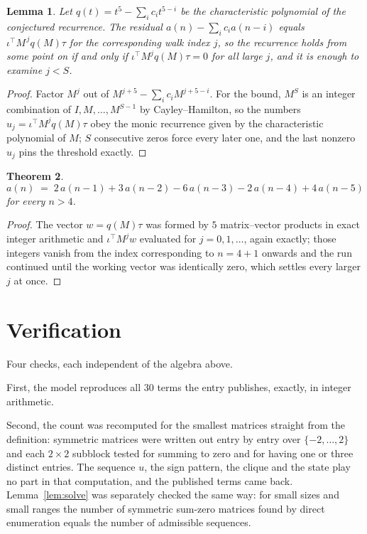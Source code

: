 \documentclass[11pt,a4paper]{article}
\theoremstyle{plain}
\newtheorem{theorem}{Theorem}
\newtheorem{lemma}[theorem]{Lemma}
\theoremstyle{definition}
\begin{document}
\begin{lemma}\label{lem:crit}
Let $q(t)=t^{5}-\sum_i c_it^{5-i}$ be the characteristic polynomial of the
conjectured recurrence. The residual $a(n)-\sum_ic_ia(n-i)$ equals
$\iota^{\!\top}M^{\,j}q(M)\tau$ for the corresponding walk index $j$, so the recurrence
holds from some point on if and only if $\iota^{\!\top}M^{j}q(M)\tau=0$ for all large $j$,
and it is enough to examine $j<S$.
\end{lemma}

\begin{proof}
Factor $M^{j}$ out of $M^{j+5}-\sum_ic_iM^{j+5-i}$. For the bound, $M^{S}$
is an integer combination of $I,M,\dots,M^{S-1}$ by Cayley--Hamilton, so the numbers
$u_j=\iota^{\!\top}M^{j}q(M)\tau$ obey the monic recurrence given by the characteristic
polynomial of $M$; $S$ consecutive zeros force every later one, and the last nonzero $u_j$
pins the threshold exactly.
\end{proof}

\begin{theorem}
\[
a(n)\;=\;2\,a(n-1) + 3\,a(n-2) - 6\,a(n-3) - 2\,a(n-4) + 4\,a(n-5)
\]
for every $n>4$.
\end{theorem}

\begin{proof}
The vector $w=q(M)\tau$ was formed by $5$ matrix--vector products in exact integer
arithmetic and $\iota^{\!\top}M^{j}w$ evaluated for $j=0,1,\dots$, again exactly; those
integers vanish from the index corresponding to $n=4+1$ onwards and the run continued
until the working vector was identically zero, which settles every larger $j$ at once.
\end{proof}

\section{Verification}

Four checks, each independent of the algebra above.

First, the model reproduces all $30$ terms the entry publishes, exactly, in integer
arithmetic.

Second, the count was recomputed for the smallest matrices straight from the definition:
symmetric matrices were written out entry by entry over $\{-2,\dots,2\}$ and each
$2\times2$ subblock tested for summing to zero and for having one or three distinct entries. The
sequence $u$, the sign pattern, the clique and the state play no part in that computation, and
the published terms came back. Lemma~\ref{lem:solve} was separately checked the same way: for
small sizes and small ranges the number of symmetric sum-zero matrices found by direct
enumeration equals the number of admissible sequences.
\end{document}
